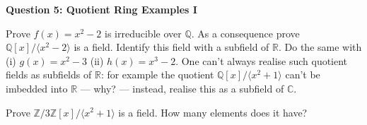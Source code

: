 \documentclass[11pt,twoside, a4paper]{report}
\theoremstyle{plain}
\theoremstyle{definition}
\begin{document}
\begin{center}
{\bf Question 5: Quotient Ring Examples I}
\end{center} 

Prove $f(x)=x^{2}-2$ is irreducible over $\mathbb{Q}$. As a consequence prove $\mathbb{Q}[x]/\langle x^{2}-2 \rangle$ is a field. Identify this field with a subfield of $\mathbb{R}$. Do the same with (i) $g(x)=x^{2} -3$ (ii) $h(x) = x^{3} - 2$. One can't always realise such quotient fields as subfields of $\mathbb{R}$: for example the quotient $\mathbb{Q}[x]/\langle  x^{2} + 1\rangle$ can't be imbedded into $\mathbb{R}$ --- why? --- instead, realise this as a subfield of $\mathbb{C}$. 

Prove $\mathbb{Z}/3\mathbb{Z}[x]/\langle x^{2} + 1 \rangle$ is a field. How many elements does it have?
\end{document}
